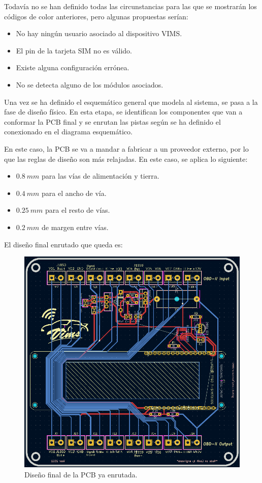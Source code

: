 Todavía no se han definido todas las circunstancias para las que se mostrarán los
códigos de color anteriores, pero algunas propuestas serían:

\begin{itemize}
  \item No hay ningún usuario asociado al dispositivo \ac{VIMS}.
  \item El pin de la tarjeta SIM no es válido.
  \item Existe alguna configuración errónea.
  \item No se detecta alguno de los módulos asociados.
\end{itemize}

Una vez se ha definido el esquemático general que modela al sistema, se pasa a la
fase de diseño físico. En esta etapa, se identifican los componentes que van a
conformar la PCB final y se enrutan las pistas según se ha definido el conexionado
en el diagrama esquemático.

En este caso, la PCB se va a mandar a fabricar a un proveedor externo, por lo que
las reglas de diseño son más relajadas. En este caso, se aplica lo siguiente:

\begin{itemize}
  \item $0.8~mm$ para las vías de alimentación y tierra.
  \item $0.4~mm$ para el ancho de vía.
  \item $0.25~mm$ para el resto de vías.
  \item $0.2~mm$ de margen entre vías.
\end{itemize}

El diseño final enrutado que queda es:

\begin{figure}[H]
  \centering
  \includegraphics[width=\linewidth]{images/pcb-design.png}
  \caption{Diseño final de la PCB ya enrutada.}
  \label{fig:pcb-design}
\end{figure}

